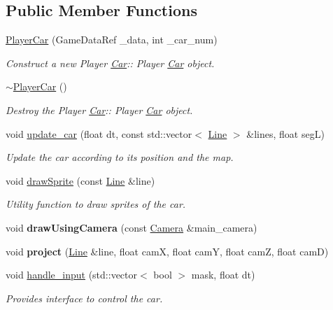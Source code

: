\subsection*{Public Member Functions}
\begin{DoxyCompactItemize}
\item 
\hyperlink{classcp_1_1_player_car_ae45b93194883e336252dc2c0563f228c}{Player\+Car} (Game\+Data\+Ref \+\_\+data, int \+\_\+car\+\_\+num)
\begin{DoxyCompactList}\small\item\em Construct a new Player \hyperlink{classcp_1_1_car}{Car}\+:\+: Player \hyperlink{classcp_1_1_car}{Car} object. \end{DoxyCompactList}\item 
\mbox{\label{classcp_1_1_player_car_ac12da40fef77bb3175fd0ff42a07d4c8}} 
\hyperlink{classcp_1_1_player_car_ac12da40fef77bb3175fd0ff42a07d4c8}{$\sim$\+Player\+Car} ()
\begin{DoxyCompactList}\small\item\em Destroy the Player \hyperlink{classcp_1_1_car}{Car}\+:\+: Player \hyperlink{classcp_1_1_car}{Car} object. \end{DoxyCompactList}\item 
void \hyperlink{classcp_1_1_player_car_a7c99c7961e6e6301529b65cfdc1104bf}{update\+\_\+car} (float dt, const std\+::vector$<$ \hyperlink{classcp_1_1_line}{Line} $>$ \&lines, float segL)
\begin{DoxyCompactList}\small\item\em Update the car according to it\textquotesingle{}s position and the map. \end{DoxyCompactList}\item 
void \hyperlink{classcp_1_1_player_car_a753b76abce4b6555916ca26919e614f0}{draw\+Sprite} (const \hyperlink{classcp_1_1_line}{Line} \&line)
\begin{DoxyCompactList}\small\item\em Utility function to draw sprites of the car. \end{DoxyCompactList}\item 
\mbox{\label{classcp_1_1_player_car_abbb6255a3d76d5b09c119f88abe30235}} 
void {\bfseries draw\+Using\+Camera} (const \hyperlink{classcp_1_1_camera}{Camera} \&main\+\_\+camera)
\item 
\mbox{\label{classcp_1_1_player_car_a377cc2988520e44e4658bc5efdb64fc1}} 
void {\bfseries project} (\hyperlink{classcp_1_1_line}{Line} \&line, float camX, float camY, float camZ, float camD)
\item 
void \hyperlink{classcp_1_1_player_car_aa3122b8ea7b398d5b82a5883d052835a}{handle\+\_\+input} (std\+::vector$<$ bool $>$ mask, float dt)
\begin{DoxyCompactList}\small\item\em Provides interface to control the car. \end{DoxyCompactList}\end{DoxyCompactItemize}
